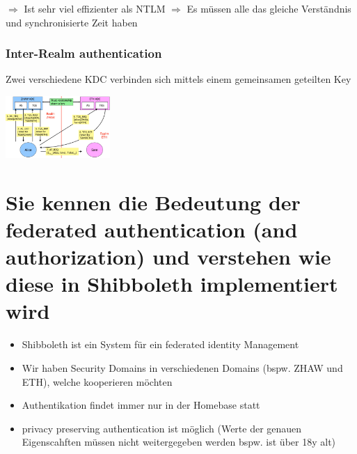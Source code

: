 \documentclass{report}
\newenvironment{Figure}
	{\par\medskip\noindent\minipage{\linewidth}}
	{\endminipage\par\medskip}
\theoremstyle{definition}
\theoremstyle{example}
\begin{document}
$\Rightarrow$ Ist sehr viel effizienter als NTLM
$\Rightarrow$ Es müssen alle das gleiche Verständnis und synchronisierte Zeit haben

		\subsubsection{Inter-Realm authentication}
Zwei verschiedene KDC verbinden sich mittels einem gemeinsamen geteilten Key
\begin{Figure}
\centering
\includegraphics[width=150px]{img/InterRealmAuthentication.png}
	\label{fig:Abbildung des Schemas für den federated Authentication mittels Keberos}
\end{Figure}

\section{Sie kennen die Bedeutung der federated authentication (and authorization) und verstehen wie diese in Shibboleth implementiert wird}
\begin{itemize}
	\item Shibboleth ist ein System für ein federated identity Management
	\item Wir haben Security Domains in verschiedenen Domains (bspw. ZHAW und ETH), welche kooperieren möchten
	\item Authentikation findet immer nur in der Homebase statt
	\item privacy preserving authentication ist möglich (Werte der genauen Eigenscahften müssen nicht weitergegeben werden bspw. ist über 18y alt)
\end{itemize}
\end{document}
